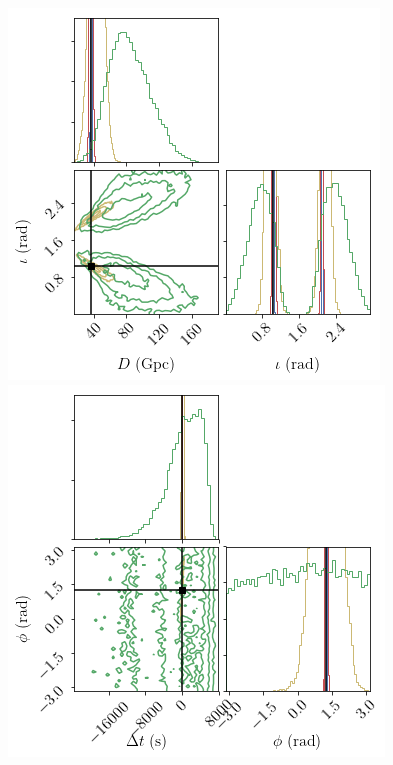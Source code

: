 \documentclass[aps,showpacs,twocolumn,prd,superscriptaddress,nofootinbib]{revtex4-1}
\begin{document}
\begin{figure}
\begin{minipage}{.32\linewidth}
      \includegraphics[width=.99\linewidth]{corner_smbh_case9_hm_tseries_Dinc.png}
   \end{minipage}
   \begin{minipage}{.32\linewidth}
      \includegraphics[width=.99\linewidth]{corner_smbh_case9_hm_tseries_tphi.png}

\end{minipage}
\end{figure}
\end{document}
